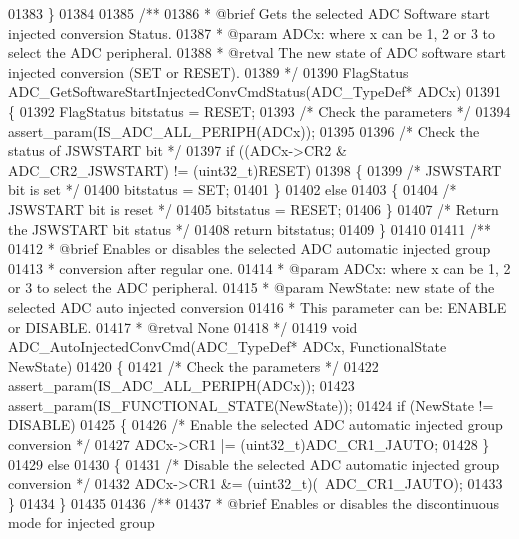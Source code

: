 \begin{DoxyCode}
01383 \}
01384 
01385 \textcolor{comment}{/**}
01386 \textcolor{comment}{  * @brief  Gets the selected ADC Software start injected conversion Status.}
01387 \textcolor{comment}{  * @param  ADCx: where x can be 1, 2 or 3 to select the ADC peripheral.}
01388 \textcolor{comment}{  * @retval The new state of ADC software start injected conversion (SET or RESET).}
01389 \textcolor{comment}{  */}
01390 FlagStatus ADC_GetSoftwareStartInjectedConvCmdStatus(ADC\_TypeDef* ADCx)
01391 \{
01392   FlagStatus bitstatus = RESET;
01393   \textcolor{comment}{/* Check the parameters */}
01394   assert_param(IS\_ADC\_ALL\_PERIPH(ADCx));
01395 
01396   \textcolor{comment}{/* Check the status of JSWSTART bit */}
01397   \textcolor{keywordflow}{if} ((ADCx->CR2 & ADC_CR2_JSWSTART) != (uint32\_t)RESET)
01398   \{
01399     \textcolor{comment}{/* JSWSTART bit is set */}
01400     bitstatus = SET;
01401   \}
01402   \textcolor{keywordflow}{else}
01403   \{
01404     \textcolor{comment}{/* JSWSTART bit is reset */}
01405     bitstatus = RESET;
01406   \}
01407   \textcolor{comment}{/* Return the JSWSTART bit status */}
01408   \textcolor{keywordflow}{return}  bitstatus;
01409 \}
01410 
01411 \textcolor{comment}{/**}
01412 \textcolor{comment}{  * @brief  Enables or disables the selected ADC automatic injected group }
01413 \textcolor{comment}{  *         conversion after regular one.}
01414 \textcolor{comment}{  * @param  ADCx: where x can be 1, 2 or 3 to select the ADC peripheral.}
01415 \textcolor{comment}{  * @param  NewState: new state of the selected ADC auto injected conversion}
01416 \textcolor{comment}{  *          This parameter can be: ENABLE or DISABLE.}
01417 \textcolor{comment}{  * @retval None}
01418 \textcolor{comment}{  */}
01419 \textcolor{keywordtype}{void} ADC_AutoInjectedConvCmd(ADC\_TypeDef* ADCx, FunctionalState NewState)
01420 \{
01421   \textcolor{comment}{/* Check the parameters */}
01422   assert_param(IS\_ADC\_ALL\_PERIPH(ADCx));
01423   assert_param(IS\_FUNCTIONAL\_STATE(NewState));
01424   \textcolor{keywordflow}{if} (NewState != DISABLE)
01425   \{
01426     \textcolor{comment}{/* Enable the selected ADC automatic injected group conversion */}
01427     ADCx->CR1 |= (uint32\_t)ADC_CR1_JAUTO;
01428   \}
01429   \textcolor{keywordflow}{else}
01430   \{
01431     \textcolor{comment}{/* Disable the selected ADC automatic injected group conversion */}
01432     ADCx->CR1 &= (uint32\_t)(~ADC_CR1_JAUTO);
01433   \}
01434 \}
01435 
01436 \textcolor{comment}{/**}
01437 \textcolor{comment}{  * @brief  Enables or disables the discontinuous mode for injected group }

\end{DoxyCode}
